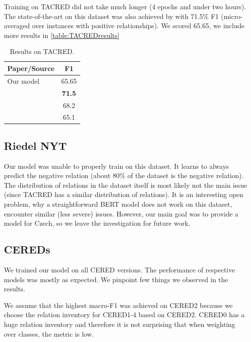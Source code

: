 Training on TACRED did not take much longer (4 epochs and under two hours). The state-of-the-art on this dataset was also achieved by \cite{baldini-soares-etal-2019-matching} with 71.5\% F1 (micro-averaged over instances with positive relationships). We scored 65.65, we include more results in \autoref{table:TACREDresults}


\begin{table}[h]
\centering
\caption{Results on TACRED.}
\label{table:TACREDresults}
\begin{tabular}{l c }
\hline
Paper/Source & F1 \\
\hline
\hline
Our model & 65.65 \\
\textbf{\cite{baldini-soares-etal-2019-matching}} & \textbf{71.5} \\
\textit{\cite{zhang-etal-2018-graph-TACRED}} & 68.2 \\
\textit{\cite{zhang-etal-2017-position_TACRED}} & 65.1 \\
\hline

\end{tabular}
\end{table}

\subsection{Riedel NYT}

Our model was unable to properly train on this dataset. It learns to always predict the negative relation (about 80\% of the dataset is the negative relation). The distribution of relations in the dataset itself is most likely not the main issue (since TACRED has a similar distribution of relations). It is an interesting open problem, why a straightforward BERT model does not work on this dataset, \cite{nyt-nefunguje} encounter similar (less severe) issues. However, our main goal was to provide a model for Czech, so we leave the investigation for future work.




\subsection{CEREDs}
We trained our model on all CERED versions. The performance of respective models was mostly as expected.  We pinpoint few things we observed in the results. 

We assume that the highest macro-F1 was achieved on CERED2 because we choose the relation inventory for CERED1-4 based on CERED2. CERED0 has a huge relation inventory and therefore it is not surprising that when weighting over classes, the metric is low.

